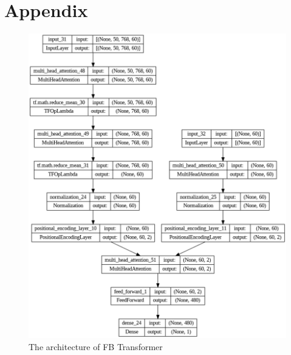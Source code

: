 \documentclass[11pt]{article}
\begin{document}



\appendix

\section{Appendix}

\begin{figure}[h]
  \centering
  \includegraphics[width=\textwidth]{transformer_structure.png}
  \caption{The architecture of FB Transformer}
  \label{fig:fb_transformer}
\end{figure}
\end{document}
